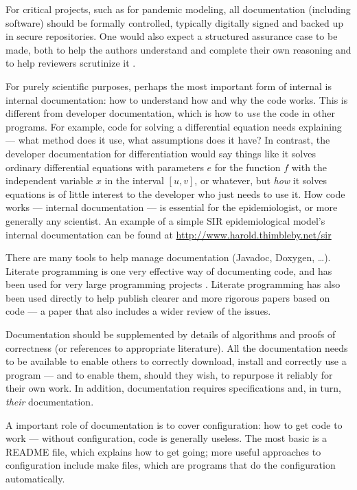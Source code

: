 \documentclass{article}
\begin{document}
{For critical projects, such as for pandemic modeling, all documentation (including software) should be formally controlled, typically digitally signed and backed up in secure repositories. One would also expect a structured assurance case to be made, both to help the authors understand and complete their own reasoning and to help reviewers scrutinize it \cite{assurance-case}.
}

For purely scientific purposes, perhaps the most important form of internal is internal documentation: how to understand how and why the code works. This is different from developer documentation, which is how to \emph{use\/} the code in other programs. For example, code for solving a differential equation needs explaining --- what method does it use, what assumptions does it have? In contrast, the developer documentation for differentiation would say things like it solves ordinary differential equations with parameters $e$ for the function $f$ with the independent variable $x$ in the interval $[u,v]$, or whatever, but \emph{how\/} it solves equations is of little interest to the developer who just needs to use it. How code works --- internal documentation --- is essential for the epidemiologist, or more generally any scientist. An example of a simple SIR epidemiological model's internal documentation can be found at \url{http://www.harold.thimbleby.net/sir} 

There are many tools to help manage documentation (Javadoc, Doxygen, \ldots). Literate programming is one very effective way of documenting code, and has been used for very large programming projects \cite{LP}. Literate programming has also been used directly to help publish clearer and more rigorous papers based on code \cite{relit} --- a paper that also includes a wider review of the issues.

Documentation should be supplemented by details of algorithms and proofs of correctness (or references to appropriate literature). All the documentation needs to be available to enable others to correctly download, install and correctly use a program --- and to enable them, should they wish, to repurpose it reliably for their own work. In addition, documentation requires specifications and, in turn, \emph{their\/} documentation. 

A important role of documentation is to cover configuration: how to get code to work --- without configuration, code is generally useless. The most basic is a README file, which explains how to get going; more useful approaches to configuration include make files, which are programs that do the configuration automatically.
\end{document}
